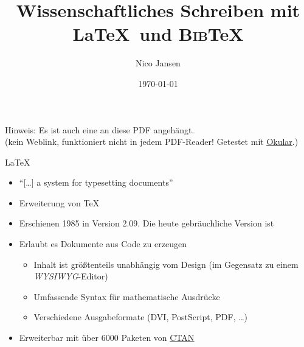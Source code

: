 \documentclass[aspectratio=169]{beamer}
\title{Wissenschaftliches Schreiben mit \LaTeX~und \textsc{Bib}\TeX}
\author{Nico Jansen}
\date{\today}
\newif\iflightmode
\providecommand{\tightlist}{\setlength{\itemsep}{0pt}\setlength{\parskip}{0pt}}
\newcommand\citestyle[1]{\textcolor{foreground-secondary}{\textsuperscript{#1}}}
\let\oldautocite\autocite
\renewcommand{\autocite}[1]{\citestyle{\oldautocite{#1}}}
\begin{document}
        \begin{frame}
            \maketitle
            \iflightmode
            \else
                \textcolor{foreground-secondary}{
                    Hinweis: Es ist auch eine 
                    an diese PDF angehängt. \\
                    (kein Weblink, funktioniert nicht in jedem PDF-Reader! Getestet mit \href{https://okular.kde.org)}{\alert{\underline{Okular}}}.)
                }
            \fi
        \end{frame}

    
        
    \begin{frame}{\LaTeX}
    \protect\hypertarget{section}{}
    \begin{itemize}
    \tightlist
    \item
      \enquote{[\ldots] a system for typesetting documents}\autocite{latex}
    \item
      Erweiterung von \TeX\autocite{latex}
    \item
      Erschienen 1985 in Version 2.09. Die heute gebräuchliche Version
      ist \autocite{latex}
    \item
      Erlaubt es Dokumente aus Code zu erzeugen\autocite{latex}

      \begin{itemize}
      \tightlist
      \item
        Inhalt ist größtenteils unabhängig vom Design (im Gegensatz zu
        einem \emph{WYSIWYG}-Editor)\autocite{latex}
      \item
        Umfassende Syntax für mathematische Ausdrücke\autocite{latex}
      \item
        Verschiedene Ausgabeformate (DVI\autocite{latex},
        PostScript\autocite{ctan-dvips}, PDF\autocite{ctan-dvipdfmx},
        \ldots)
      \end{itemize}
    \item
      Erweiterbar mit über 6000 Paketen von
      \href{https://ctan.org}{\alert{\underline{CTAN}}}\autocite{ctan}
    \end{itemize}
    \end{frame}
\end{document}
